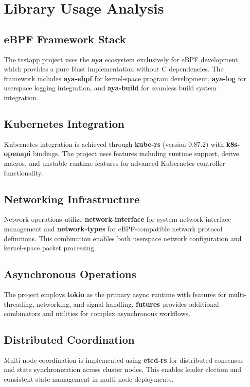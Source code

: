\documentclass{article}
\begin{document}
\section*{Library Usage Analysis}

\subsection*{eBPF Framework Stack}
The testapp project uses the \textbf{aya} ecosystem exclusively for eBPF development, which provides a pure Rust implementation without C dependencies. The framework includes \textbf{aya-ebpf} for kernel-space program development, \textbf{aya-log} for userspace logging integration, and \textbf{aya-build} for seamless build system integration.

\subsection*{Kubernetes Integration}
Kubernetes integration is achieved through \textbf{kube-rs} (version 0.87.2) with \textbf{k8s-openapi} bindings. The project uses features including runtime support, derive macros, and unstable runtime features for advanced Kubernetes controller functionality.

\subsection*{Networking Infrastructure}
Network operations utilize \textbf{network-interface} for system network interface management and \textbf{network-types} for eBPF-compatible network protocol definitions. This combination enables both userspace network configuration and kernel-space packet processing.

\subsection*{Asynchronous Operations}
The project employs \textbf{tokio} as the primary async runtime with features for multi-threading, networking, and signal handling. \textbf{futures} provides additional combinators and utilities for complex asynchronous workflows.

\subsection*{Distributed Coordination}
Multi-node coordination is implemented using \textbf{etcd-rs} for distributed consensus and state synchronization across cluster nodes. This enables leader election and consistent state management in multi-node deployments.
\end{document}
